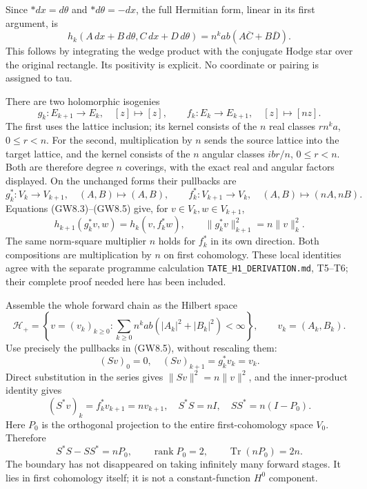 Since \(*dx=d\theta\) and \(*d\theta=-dx\), the full Hermitian form,
linear in its first argument, is \[
h_k(A\,dx+B\,d\theta,C\,dx+D\,d\theta)
=n^kab(A\overline C+B\overline D).
\tag{GW8.3}
\] This follows by integrating the wedge product with the conjugate
Hodge star over the original rectangle. Its positivity is explicit. No
coordinate or pairing is assigned to tau.

There are two holomorphic isogenies \[
g_k:E_{k+1}\longrightarrow E_k,\quad[z]\longmapsto[z],
\qquad
f_k:E_k\longrightarrow E_{k+1},\quad[z]\longmapsto[nz].
\tag{GW8.4}
\] The first uses the lattice inclusion; its kernel consists of the
\(n\) real classes \(rn^ka\), \(0\le r<n\). For the second,
multiplication by \(n\) sends the source lattice into the target
lattice, and the kernel consists of the \(n\) angular classes
\(ib r/n\), \(0\le r<n\). Both are therefore degree \(n\) coverings,
with the exact real and angular factors displayed. On the unchanged
forms their pullbacks are \[
g_k^*:V_k\to V_{k+1},\quad(A,B)\mapsto(A,B),
\qquad
f_k^*:V_{k+1}\to V_k,\quad(A,B)\mapsto(nA,nB).
\tag{GW8.5}
\] Equations (GW8.3)--(GW8.5) give, for \(v\in V_k,w\in V_{k+1}\), \[
h_{k+1}(g_k^*v,w)=h_k(v,f_k^*w),
\qquad\|g_k^*v\|_{k+1}^2=n\|v\|_k^2.
\tag{GW8.6}
\] The same norm-square multiplier \(n\) holds for \(f_k^*\) in its own
direction. Both compositions are multiplication by \(n\) on first
cohomology. These local identities agree with the separate programme
calculation \nolinkurl{TATE_H1_DERIVATION.md}, T5--T6; their complete
proof needed here has been included.

Assemble the whole forward chain as the Hilbert space \[
\mathcal H_+=\left\{v=(v_k)_{k\ge0}:\sum_{k\ge0}n^kab
(|A_k|^2+|B_k|^2)<\infty\right\},\qquad v_k=(A_k,B_k).
\tag{GW8.7}
\] Use precisely the pullbacks in (GW8.5), without rescaling them: \[
(Sv)_0=0,\quad(Sv)_{k+1}=g_k^*v_k=v_k.
\] Direct substitution in the series gives \(\|Sv\|^2=n\|v\|^2\), and
the inner-product identity gives \[
(S^*v)_k=f_k^*v_{k+1}=nv_{k+1},
\quad S^*S=nI,\quad SS^*=n(I-P_0).
\tag{GW8.8}
\] Here \(P_0\) is the orthogonal projection to the entire
first-cohomology space \(V_0\). Therefore \[
S^*S-SS^*=nP_0,
\qquad\operatorname{rank}P_0=2,
\qquad\operatorname{Tr}(nP_0)=2n.
\tag{GW8.9}
\] The boundary has not disappeared on taking infinitely many forward
stages. It lies in first cohomology itself; it is not a
constant-function \(H^0\) component.

